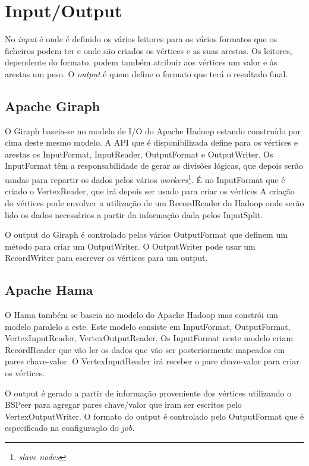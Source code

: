 \newpage
\section{Input/Output}
No \textit{input} é onde é definido os vários leitores para os vários formatos que os ficheiros podem ter e onde são criados os vértices e as suas arestas. Os leitores, dependente do formato, podem também atribuir aos vértices um valor e às arestas um peso.
O \textit{output} é quem define	 o formato que terá o resultado final.
\subsection*{Apache Giraph}
O Giraph baseia-se no modelo de I/O do Apache Hadoop estando construído por cima deste mesmo modelo.
A API que é disponibilizada define para os vértices e arestas os InputFormat, InputReader, OutputFormat e OutputWriter.
Os InputFormat têm a responsabilidade de gerar as divisões lógicas, que depois serão usadas para repartir os dados pelos vários
\textit{workers}\footnote{\textit{slave nodes}}. É no InputFormat que é criado o VertexReader, que irá depois ser usado para criar os vértices
A criação do vértices pode envolver a utilização de um RecordReader do Hadoop onde serão lido os dados necessários a partir da informação dada pelos
InputSplit.

O output do Giraph é controlado pelos vários OutputFormat que definem um método para criar um OutputWriter. O OutputWriter pode usar um RecordWriter
para escrever os vértices para um output.

\subsection*{Apache Hama}

O Hama também se baseia no modelo do Apache Hadoop mas constrói um modelo paralelo a este.
Este modelo consiste em InputFormat, OutputFormat, VertexInputReader, VertexOutputReader. Os InputFormat neste modelo criam RecordReader 
que vão ler os dados que vão ser posteriormente mapeados em pares chave-valor. O VertexInputReader irá receber o pare chave-valor para criar os
vértices.

O output é gerado a partir de informação proveniente dos vértices utilizando o BSPeer para agregar pares chave/valor que iram
ser escritos pelo VertexOutputWriter. O formato do output é controlado pelo OutputFormat que é especificado na
configuração do \textit{job}.

